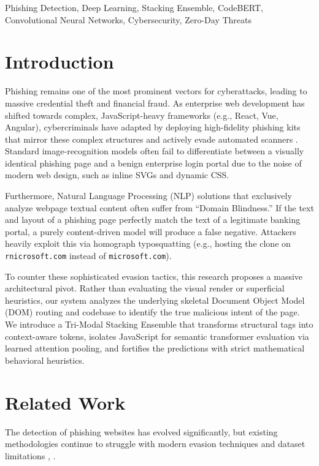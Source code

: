 \documentclass[conference]{IEEEtran}
\begin{document}
\begin{IEEEkeywords}
Phishing Detection, Deep Learning, Stacking Ensemble, CodeBERT, Convolutional Neural Networks, Cybersecurity, Zero-Day Threats
\end{IEEEkeywords}

\section{Introduction}
Phishing remains one of the most prominent vectors for cyberattacks, leading to massive credential theft and financial fraud. As enterprise web development has shifted towards complex, JavaScript-heavy frameworks (e.g., React, Vue, Angular), cybercriminals have adapted by deploying high-fidelity phishing kits that mirror these complex structures and actively evade automated scanners \cite{oest}. Standard image-recognition models often fail to differentiate between a visually identical phishing page and a benign enterprise login portal due to the noise of modern web design, such as inline SVGs and dynamic CSS.

Furthermore, Natural Language Processing (NLP) solutions that exclusively analyze webpage textual content often suffer from ``Domain Blindness.'' If the text and layout of a phishing page perfectly match the text of a legitimate banking portal, a purely content-driven model will produce a false negative. Attackers heavily exploit this via homograph typosquatting (e.g., hosting the clone on \texttt{rnicrosoft.com} instead of \texttt{microsoft.com}).

To counter these sophisticated evasion tactics, this research proposes a massive architectural pivot. Rather than evaluating the visual render or superficial heuristics, our system analyzes the underlying skeletal Document Object Model (DOM) routing and codebase to identify the true malicious intent of the page. We introduce a Tri-Modal Stacking Ensemble that transforms structural tags into context-aware tokens, isolates JavaScript for semantic transformer evaluation via learned attention pooling, and fortifies the predictions with strict mathematical behavioral heuristics.

\section{Related Work}
The detection of phishing websites has evolved significantly, but existing methodologies continue to struggle with modern evasion techniques and dataset limitations \cite{adebowale}, \cite{sommese}.
\end{document}

